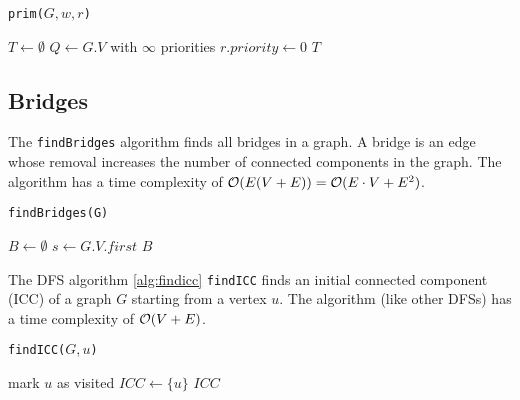 \documentclass{article}
\begin{document}
\begin{algorithm}[H]
  \caption{\texttt{prim($G, w, r$)}}

  \BlankLine

  $T \gets \emptyset$\;
  $Q \gets G.V$ with $\infty$ priorities
  $r.priority \gets 0$\;
  \Return $T$\;
\end{algorithm}

\subsection{Bridges}
The \texttt{findBridges} algorithm finds all bridges in a graph. A bridge is an edge whose removal increases the number of connected components in the graph. The algorithm has a time complexity of $\mathcal{O}(E(V+E))=\mathcal{O}(E\cdot V+E^2)$.\par
\begin{algorithm}[H]
  \caption{\texttt{findBridges(G)}}

  \BlankLine

  $B \gets \emptyset$\;
  $s \gets G.V.first$\;
  \Return $B$\;
\end{algorithm}

The DFS algorithm \ref{alg:findicc} \texttt{findICC} finds an initial connected component (ICC) of a graph $G$ starting from a vertex $u$. The algorithm (like other DFSs) has a time complexity of $\mathcal{O}(V+E)$.\par
\begin{algorithm}[H]
  \caption{\texttt{findICC($G, u$)}}\label{alg:findicc}

  \BlankLine

  mark $u$ as visited\;
  $ICC \gets \{u\}$\;
  \Return $ICC$\;
\end{algorithm}
\end{document}
